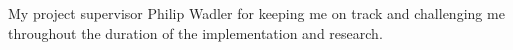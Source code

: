 \begin{acknowledgements}
  My project supervisor Philip Wadler for keeping me on track and challenging me throughout
  the duration of the implementation and research.
\end{acknowledgements}